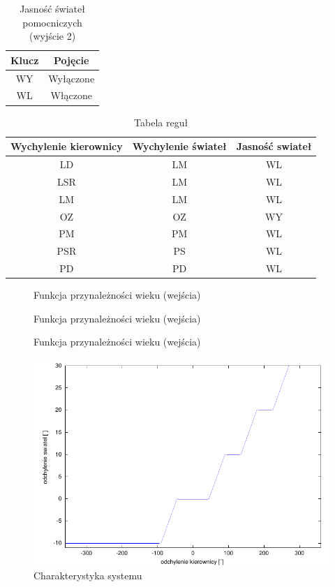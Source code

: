 \begin{table}[h]
\centering
\begin{tabular}[t]{c|c}
Klucz & Pojęcie \\
\hline
WY & Wyłączone \\
WL & Włączone \\
\end{tabular}
\caption{Jasność świateł pomocniczych (wyjście 2)}
\end{table}

\begin{table}[h]
\centering
\begin{tabular}[t]{c|c|c}
Wychylenie kierownicy & Wychylenie świateł & Jasność swiateł \\
\hline
LD & LM & WL \\
LSR & LM & WL \\
LM & LM & WL \\
OZ & OZ & WY \\
PM & PM & WL \\
PSR & PS & WL \\
PD & PD & WL \\
\end{tabular}
\caption{\label{tab:xor}Tabela reguł}
\end{table}

\begin{figure}[!h]
\centering

\caption{\label{fig:funkcja_we}Funkcja przynależności wieku (wejścia)}
\end{figure}

\begin{figure}[!h]
\centering

\caption{Funkcja przynależności wieku (wejścia)}
\end{figure}

\begin{figure}[!h]
\centering

\caption{Funkcja przynależności wieku (wejścia)}
\end{figure}

\begin{figure}[!h]
\centering
\includegraphics[scale=1.0]{src/char_swiatla.pdf}\caption{\label{fig:dane1}Charakterystyka systemu}
\end{figure}

